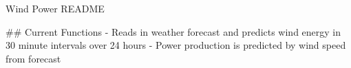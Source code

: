 Wind Power README

## Current Functions
- Reads in weather forecast and predicts wind energy in 30 minute intervals over 24 hours
- Power production is predicted by wind speed from forecast